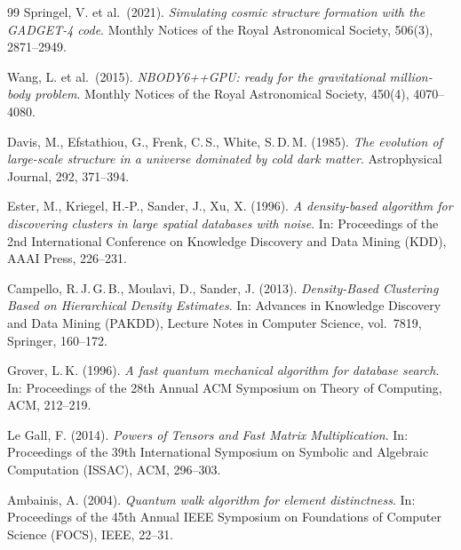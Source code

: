 ﻿\documentclass[a4paper,12pt]{report}
\theoremstyle{definition}
\begin{document}
\begin{thebibliography}{99}
Springel, V. et al.\ (2021). \textit{Simulating cosmic structure formation with the GADGET-4 code}. Monthly Notices of the Royal Astronomical Society, 506(3), 2871--2949.

Wang, L. et al.\ (2015). \textit{NBODY6++GPU: ready for the gravitational million-body problem}. Monthly Notices of the Royal Astronomical Society, 450(4), 4070--4080.


Davis, M., Efstathiou, G., Frenk, C.\,S., White, S.\,D.\,M. (1985). \textit{The evolution of large-scale structure in a universe dominated by cold dark matter}. Astrophysical Journal, 292, 371--394.

Ester, M., Kriegel, H.-P., Sander, J., Xu, X. (1996). \textit{A density-based algorithm for discovering clusters in large spatial databases with noise}. In: Proceedings of the 2nd International Conference on Knowledge Discovery and Data Mining (KDD), AAAI Press, 226--231.

Campello, R.\,J.\,G.\,B., Moulavi, D., Sander, J. (2013). \textit{Density-Based Clustering Based on Hierarchical Density Estimates}. In: Advances in Knowledge Discovery and Data Mining (PAKDD), Lecture Notes in Computer Science, vol.~7819, Springer, 160--172.


Grover, L.\,K. (1996). \textit{A fast quantum mechanical algorithm for database search}. In: Proceedings of the 28th Annual ACM Symposium on Theory of Computing, ACM, 212--219.

Le Gall, F. (2014). \textit{Powers of Tensors and Fast Matrix Multiplication}. In: Proceedings of the 39th International Symposium on Symbolic and Algebraic Computation (ISSAC), ACM, 296--303.

Ambainis, A. (2004). \textit{Quantum walk algorithm for element distinctness}. In: Proceedings of the 45th Annual IEEE Symposium on Foundations of Computer Science (FOCS), IEEE, 22--31.

\end{thebibliography}
\end{document}
